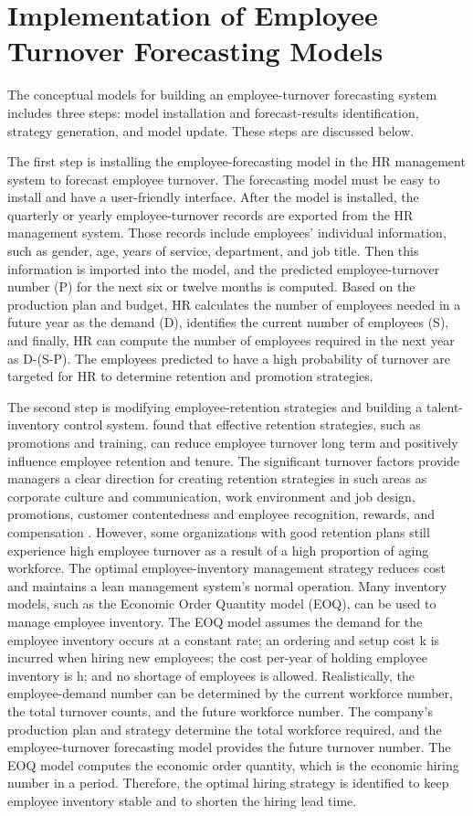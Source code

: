 \section{Implementation of Employee Turnover Forecasting Models}

The conceptual models for building an employee-turnover forecasting system includes three steps: model installation and forecast-results identification, strategy generation, and model update.  These steps are discussed below.
 
The first step is installing the employee-forecasting model in the HR management system to forecast employee turnover. The forecasting model must be easy to install and have a user-friendly interface. After the model is installed, the quarterly or yearly employee-turnover records are exported from the HR management system. Those records include employees' individual information, such as gender, age, years of service, department, and job title. Then this information is imported into the model, and the predicted employee-turnover number (P) for the next six or twelve months is computed. Based on the production plan and budget, HR calculates the number of employees needed in a future year as the demand (D), identifies the current number of employees (S), and finally, HR can compute the number of employees required in the next year as D-(S-P). The employees predicted to have a high probability of turnover are targeted for HR to determine retention and promotion strategies.  

The second step is modifying employee-retention strategies and building a talent-inventory control system. \citet{moncarz2009} found that effective retention strategies, such as promotions and training, can reduce employee turnover long term and positively influence employee retention and tenure. The significant turnover factors provide managers a clear direction for creating retention strategies in such areas as corporate culture and communication, work environment and job design, promotions, customer contentedness and employee recognition, rewards, and compensation \citep{moncarz2009}. However, some organizations with good retention plans still experience high employee turnover as a result of a high proportion of aging workforce. The optimal employee-inventory management strategy reduces cost and maintains a lean management system's normal operation. Many inventory models, such as the Economic Order Quantity model (EOQ), can be used to manage employee inventory. The EOQ model assumes the demand for the employee inventory occurs at a constant rate; an ordering and setup cost k is incurred when hiring new employees; the cost per-year of holding employee inventory is h; and no shortage of employees is allowed. Realistically, the employee-demand number can be determined by the current workforce number, the total turnover counts, and the future workforce number. The company's production plan and strategy determine the total workforce required, and the employee-turnover forecasting model provides the future turnover number. The EOQ model computes the economic order quantity, which is the economic hiring number in a period. Therefore, the optimal hiring strategy is identified to keep employee inventory stable and to shorten the hiring lead time. 

